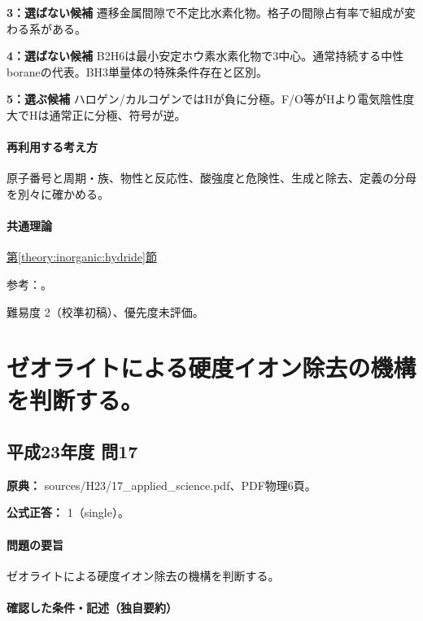 \noindent\textbf{3：選ばない候補} 遷移金属間隙で不定比水素化物。格子の間隙占有率で組成が変わる系がある。\par

\noindent\textbf{4：選ばない候補} B2H6は最小安定ホウ素水素化物で3中心。通常持続する中性boraneの代表。BH3単量体の特殊条件存在と区別。\par

\noindent\textbf{5：選ぶ候補} ハロゲン/カルコゲンではHが負に分極。F/O等がHより電気陰性度大でHは通常正に分極、符号が逆。\par

\paragraph{再利用する考え方} 原子番号と周期・族、物性と反応性、酸強度と危険性、生成と除去、定義の分母を別々に確かめる。

\paragraph{共通理論} \hyperref[theory:inorganic:hydride]{第\ref*{theory:inorganic:hydride}節}

\par 参考：\cite{inorganic_hydrogen_ref,inorganic_metalloid_ref}。

\par 難易度 2（校準初稿）、優先度未評価。

\section{ゼオライトによる硬度イオン除去の機構を判断する。}

\subsection{平成23年度 問17}
\label{q:h23-reg-applied-17}

\noindent\textbf{原典：} sources/H23/17\_applied\_science.pdf、PDF物理6頁。

\textbf{公式正答：} 1（single）。

\paragraph{問題の要旨} ゼオライトによる硬度イオン除去の機構を判断する。

\paragraph{確認した条件・記述（独自要約）}\mbox{}\par


